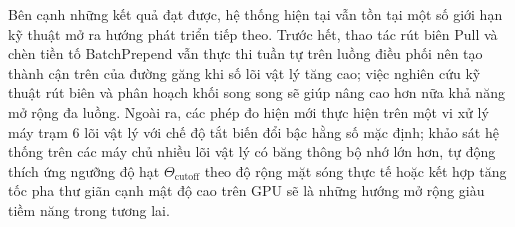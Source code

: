 \documentclass[12pt,a4paper,openany,oneside]{report}
\theoremstyle{plain}
\numberwithin{equation}{section}
\def\textsc#1{#1}%
\begin{document}
Bên cạnh những kết quả đạt được, hệ thống hiện tại vẫn tồn tại một số giới hạn kỹ thuật mở ra hướng phát triển tiếp theo. Trước hết, thao tác rút biên \textsc{Pull} và chèn tiền tố \textsc{BatchPrepend} vẫn thực thi tuần tự trên luồng điều phối nên tạo thành cận trên của đường găng khi số lõi vật lý tăng cao; việc nghiên cứu kỹ thuật rút biên và phân hoạch khối song song sẽ giúp nâng cao hơn nữa khả năng mở rộng đa luồng. Ngoài ra, các phép đo hiện mới thực hiện trên một vi xử lý máy trạm $6$ lõi vật lý với chế độ tắt biến đổi bậc hằng số mặc định; khảo sát hệ thống trên các máy chủ nhiều lõi vật lý có băng thông bộ nhớ lớn hơn, tự động thích ứng ngưỡng độ hạt $\Theta_{\mathrm{cutoff}}$ theo độ rộng mặt sóng thực tế hoặc kết hợp tăng tốc pha thư giãn cạnh mật độ cao trên GPU sẽ là những hướng mở rộng giàu tiềm năng trong tương lai.
\end{document}
